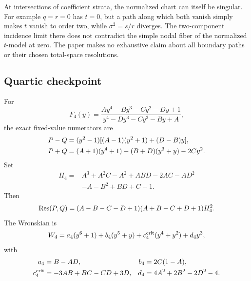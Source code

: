 At intersections of coefficient strata, the normalized chart can itself be singular. For example \(q=r=0\) has \(t=0\), but a path along which both vanish simply makes \(t\) vanish to order two, while \(\sigma^2=s/r\) diverges. The two-component incidence limit there does not contradict the simple nodal fiber of the normalized \(t\)-model at zero. The paper makes no exhaustive claim about all boundary paths or their chosen total-space resolutions.


\subsection{Quartic checkpoint}\label{sec:quartic}
For
\begin{equation}\label{eq:quartic}
 F_4(y)=\frac{Ay^4-By^3-Cy^2-Dy+1}{y^4-Dy^3-Cy^2-By+A},
\end{equation}
the exact fixed-value numerators are
\begin{align}\label{eq:quartic_fibers}
 P-Q&=(y^2-1)[(A-1)(y^2+1)+(D-B)y],\notag\\
 P+Q&=(A+1)(y^4+1)-(B+D)(y^3+y)-2Cy^2.
\end{align}
Set
\begin{equation}\label{eq:H4}
 \begin{split}
 H_4={}&A^3+A^2C-A^2+ABD-2AC-AD^2\\
       &-A-B^2+BD+C+1.
 \end{split}
\end{equation}
Then
\begin{equation}\label{eq:quartic_resultant}
 \operatorname{Res}(P,Q)=(A-B-C-D+1)(A+B-C+D+1)H_4^2.
\end{equation}
The Wronskian is
\begin{equation}\label{eq:W4}
 W_4=a_4(y^6+1)+b_4(y^5+y)+c_4^{\rm crit}(y^4+y^2)+d_4y^3,
\end{equation}
with
\begin{equation}\label{eq:W4_coeff}
 \begin{aligned}
 a_4&=B-AD,& b_4&=2C(1-A),\\
 c_4^{\rm crit}&=-3AB+BC-CD+3D,&d_4&=4A^2+2B^2-2D^2-4.
 \end{aligned}
\end{equation}
